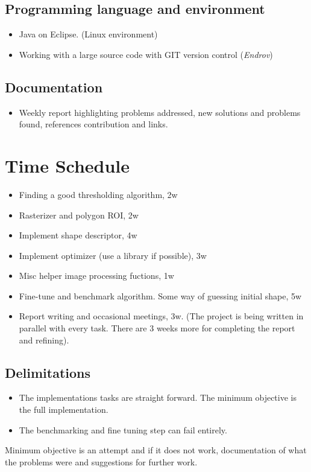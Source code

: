 \documentclass{article}
\begin{document}
\subsection{Programming language and environment}
\begin{itemize}
\item Java on Eclipse. (Linux environment)
\item Working with a large source code with GIT version control (\emph{Endrov}) 
\end{itemize}

\subsection{Documentation}
\begin{itemize}
\item Weekly report highlighting problems addressed, new solutions and 
  problems found, references contribution and links.
\end{itemize}

\section{Time Schedule}
\begin{itemize}
\item Finding a good thresholding algorithm, 2w
\item Rasterizer and polygon ROI, 2w
\item Implement shape descriptor, 4w
\item Implement optimizer (use a library if possible), 3w
\item Misc helper image processing fuctions, 1w
\item Fine-tune and benchmark algorithm. Some way of guessing initial shape, 5w
\item Report writing and occasional meetings, 3w. (The project is being
  written in parallel with every task. There are 3 weeks more for completing
  the report and refining).
\end{itemize}

\subsection{Delimitations}
\begin{itemize}
\item The implementations tasks are straight forward. The minimum objective
is the full implementation.
\item The benchmarking and fine tuning step can fail entirely.
\end{itemize}

 Minimum objective is an attempt and if it does not work, 
 documentation of what the problems were and suggestions for further work.
\end{document}
